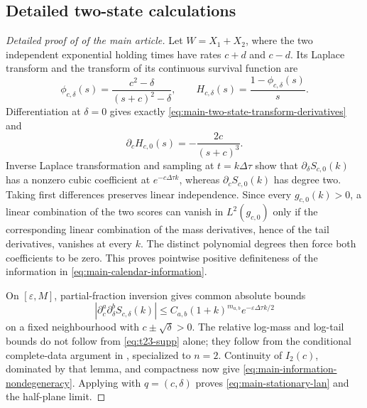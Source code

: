 \subsection{Detailed two-state calculations}
\label{sec:two-state-calculations-supp}

\begin{proof}[Detailed proof of  of the main article]
Let \(W=X_1+X_2\), where the two independent exponential holding times have
rates \(c+d\) and \(c-d\).  Its Laplace transform and the transform of its
continuous survival function are
\[
 \phi_{c,\delta}(s)
 =\frac{c^2-\delta}{(s+c)^2-\delta},
 \qquad
 H_{c,\delta}(s)=\frac{1-\phi_{c,\delta}(s)}s.
\tag{T21}\label{eq:t21-supp}
\]
Differentiation at \(\delta=0\) gives exactly \eqref{eq:main-two-state-transform-derivatives} and
\[
 \partial_cH_{c,0}(s)=-\frac{2c}{(s+c)^3}.
\tag{T22}\label{eq:t22-supp}
\]
Inverse Laplace transformation and sampling at \(t=k\Delta\tau\) show that
\(\partial_\delta S_{c,0}(k)\) has a nonzero cubic coefficient at
\(e^{-c\Delta\tau k}\), whereas \(\partial_cS_{c,0}(k)\) has degree two.
Taking first differences preserves linear independence.  Since every
\(g_{c,0}(k)>0\), a linear combination of the two scores can vanish in
\(L^2(g_{c,0})\) only if the corresponding linear combination of the mass
derivatives, hence of the tail derivatives, vanishes at every \(k\).  The
distinct polynomial degrees then force both coefficients to be zero.  This
proves pointwise positive definiteness of the information in \eqref{eq:main-calendar-information}.

On \([\varepsilon,M]\), partial-fraction inversion gives common absolute
bounds
\[
 |\partial_c^a\partial_\delta^b S_{c,\delta}(k)|
 \le C_{a,b}(1+k)^{m_{a,b}}e^{-\varepsilon\Delta\tau k/2}
\tag{T23}\label{eq:t23-supp}
\]
on a fixed neighbourhood with \(c\pm\sqrt\delta>0\).  The relative log-mass
and log-tail bounds do not follow from \eqref{eq:t23-supp} alone; they follow from
the conditional complete-data argument in
, specialized to \(n=2\).
Continuity of \(I_2(c)\), dominated by that lemma, and compactness now give
\eqref{eq:main-information-nondegeneracy}.  Applying
 with
\(q=(c,\delta)\) proves \eqref{eq:main-stationary-lan} and the half-plane limit.


\end{proof}
